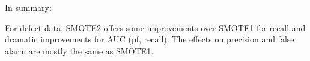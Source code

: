  





In summary:

\begin{lesson1}
    For defect data, SMOTE2  
 offers   some  improvements over SMOTE1 for recall
 and dramatic improvements for AUC (pf, recall).
 The effects on precision and false alarm are mostly the same as SMOTE1.
\end{lesson1}


